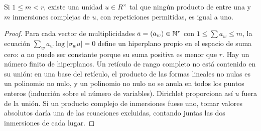 \begin{lema}
\label{lem:sh-unidad}
Si $1\le m<r$, existe una unidad $u\in R^\times$ tal que ningún producto de entre una y $m$ inmersiones complejas de $u$, con repeticiones permitidas, es igual a uno.
\end{lema}
\begin{proof}
Para cada vector de multiplicidades $a=(a_w)\in\mathbb{N}^r$ con $1\le\sum a_w\le m$, la ecuación $\sum_w a_w\log|\sigma_wu|=0$ define un hiperplano propio en el espacio de suma cero: $a$ no puede ser constante porque su suma positiva es menor que $r$. Hay un número finito de hiperplanos. Un retículo de rango completo no está contenido en su unión: en una base del retículo, el producto de las formas lineales no nulas es un polinomio no nulo, y un polinomio no nulo no se anula en todos los puntos enteros (inducción sobre el número de variables). Dirichlet proporciona así $u$ fuera de la unión. Si un producto complejo de inmersiones fuese uno, tomar valores absolutos daría una de las ecuaciones excluidas, contando juntas las dos inmersiones de cada lugar.
\end{proof}

